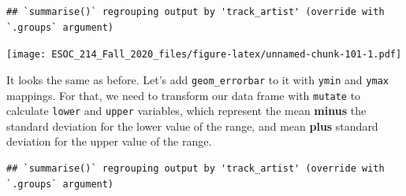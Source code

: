 \documentclass[
]{book}
\newenvironment{Shaded}{\begin{snugshade}}{\end{snugshade}}
\newcommand{\DataTypeTok}[1]{\textcolor[rgb]{0.13,0.29,0.53}{#1}}
\newcommand{\DecValTok}[1]{\textcolor[rgb]{0.00,0.00,0.81}{#1}}
\newcommand{\KeywordTok}[1]{\textcolor[rgb]{0.13,0.29,0.53}{\textbf{#1}}}
\newcommand{\NormalTok}[1]{#1}
\newcommand{\OperatorTok}[1]{\textcolor[rgb]{0.81,0.36,0.00}{\textbf{#1}}}
\newcommand{\StringTok}[1]{\textcolor[rgb]{0.31,0.60,0.02}{#1}}
\begin{document}
\begin{verbatim}
## `summarise()` regrouping output by 'track_artist' (override with `.groups` argument)
\end{verbatim}

\texttt{[image: ESOC\_214\_Fall\_2020\_files/figure-latex/unnamed-chunk-101-1.pdf]}

It looks the same as before. Let's add \texttt{geom\_errorbar} to it with \texttt{ymin} and \texttt{ymax} mappings. For that, we need to transform our data frame with \texttt{mutate} to calculate \texttt{lower} and \texttt{upper} variables, which represent the mean \textbf{minus} the standard deviation for the lower value of the range, and mean \textbf{plus} standard deviation for the upper value of the range.

\begin{Shaded}
\end{Shaded}

\begin{verbatim}
## `summarise()` regrouping output by 'track_artist' (override with `.groups` argument)
\end{verbatim}
\end{document}
